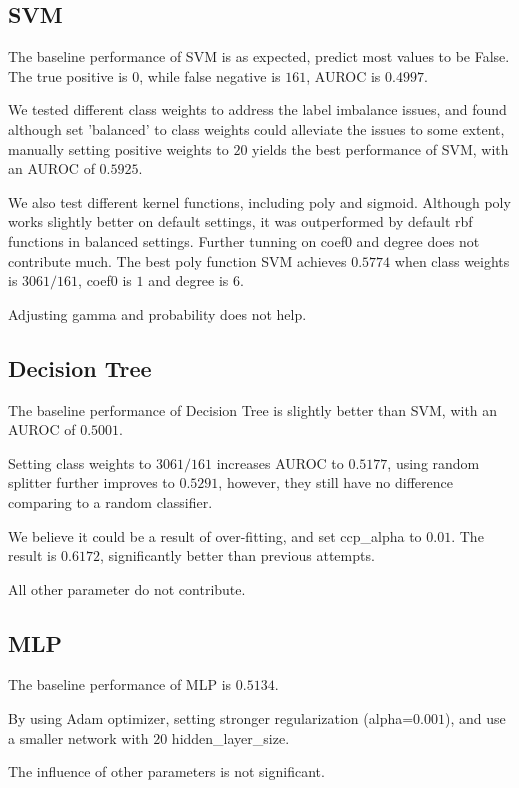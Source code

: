 \documentclass[11pt,twocolumn,letterpaper]{article}
\begin{document}
\subsection{SVM}

The baseline performance of SVM is as expected, predict most values to be False.
The true positive is $0$, while false negative is $161$, AUROC is $0.4997$.

We tested different class weights to address the label imbalance issues, and found although set 'balanced' to class weights could alleviate the issues to some extent, manually setting positive weights to $20$ yields the best performance of SVM, with an AUROC of $0.5925$.

We also test different kernel functions, including poly and sigmoid.
Although poly works slightly better on default settings, it was outperformed by default rbf functions in balanced settings.
Further tunning on coef0 and degree does not contribute much.
The best poly function SVM achieves $0.5774$ when class weights is $3061/161$, coef0 is $1$ and degree is $6$.

Adjusting gamma and probability does not help.

\subsection{Decision Tree}

The baseline performance of Decision Tree is slightly better than SVM, with an AUROC of $0.5001$.

Setting class weights to $3061/161$ increases AUROC to $0.5177$, using random splitter further improves to $0.5291$, however, they still have no difference comparing to a random classifier.

We believe it could be a result of over-fitting, and set ccp\_alpha to $0.01$.
The result is $0.6172$, significantly better than previous attempts.

All other parameter do not contribute.

\subsection{MLP}

The baseline performance of MLP is $0.5134$.

By using Adam optimizer, setting stronger regularization (alpha=$0.001$), and use a smaller network with $20$ hidden\_layer\_size.

The influence of other parameters is not significant.
\end{document}

